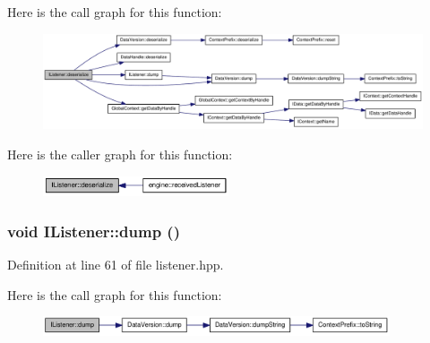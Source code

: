 Here is the call graph for this function:\nopagebreak
\begin{figure}[H]
\begin{center}
\leavevmode
\includegraphics[width=420pt]{class_i_listener_a893f2f48814ce66437c6f2add51c8b8d_cgraph}
\end{center}
\end{figure}


Here is the caller graph for this function:\nopagebreak
\begin{figure}[H]
\begin{center}
\leavevmode
\includegraphics[width=155pt]{class_i_listener_a893f2f48814ce66437c6f2add51c8b8d_icgraph}
\end{center}
\end{figure}
\hypertarget{class_i_listener_ae53c9b5bd1067445dd09804efd04ea5c}{
\subsubsection[{dump}]{\setlength{\rightskip}{0pt plus 5cm}void IListener::dump ()}}
\label{class_i_listener_ae53c9b5bd1067445dd09804efd04ea5c}


Definition at line 61 of file listener.hpp.

Here is the call graph for this function:\nopagebreak
\begin{figure}[H]
\begin{center}
\leavevmode
\includegraphics[width=290pt]{class_i_listener_ae53c9b5bd1067445dd09804efd04ea5c_cgraph}
\end{center}
\end{figure}


